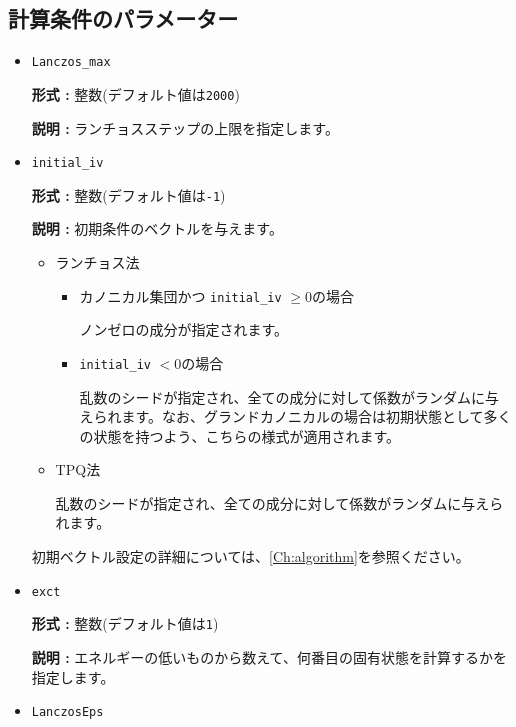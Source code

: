 \subsection{計算条件のパラメーター}

\begin{itemize}
\item \verb|Lanczos_max|

{\bf 形式 :} 整数(デフォルト値は\verb|2000|)

{\bf 説明 :} ランチョスステップの上限を指定します。

\item \verb|initial_iv|

{\bf 形式 :} 整数(デフォルト値は\verb|-1|)

{\bf 説明 :}  {初期条件のベクトルを与えます。}
\begin{itemize}
\item{ランチョス法}
\begin{itemize}
\item{カノニカル集団かつ \verb|initial_iv| $\geq 0$の場合}

ノンゼロの成分が指定されます。

\item{ \verb|initial_iv| $< 0$の場合}

乱数のシードが指定され、全ての成分に対して係数がランダムに与えられます。なお、グランドカノニカルの場合は初期状態として多くの状態を持つよう、こちらの様式が適用されます。
\end{itemize}

\item{TPQ法}

乱数のシードが指定され、全ての成分に対して係数がランダムに与えられます。
\end{itemize}
初期ベクトル設定の詳細については、\ref{Ch:algorithm}を参照ください。




\item \verb|exct|

{\bf 形式 :} 整数(デフォルト値は\verb|1|)

{\bf 説明 :} エネルギーの低いものから数えて、何番目の固有状態を計算するかを指定します。

\item \verb|LanczosEps|


\end{itemize}
